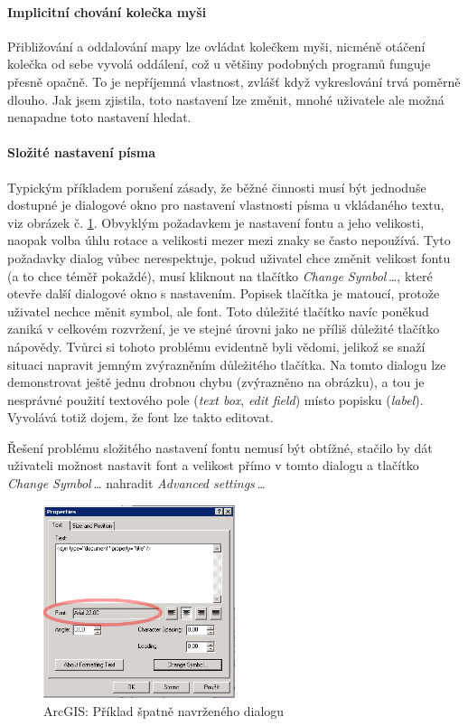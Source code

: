 \documentclass[a4paper,12pt,draft]{article}
\begin{document}
{\paragraph*{Implicitní chování kolečka myši} Přibližování a
oddalování mapy lze ovládat kolečkem myši, nicméně otáčení
kolečka od sebe vyvolá oddálení, což u většiny podobných programů
funguje přesně opačně. To je nepříjemná vlastnost, zvlášť když
vykreslování trvá poměrně dlouho. Jak jsem zjistila, toto nastavení
lze změnit, mnohé uživatele ale možná nenapadne toto nastavení hledat.

\paragraph*{Složité nastavení písma}  Typickým příkladem porušení
zásady, že běžné činnosti musí být jednoduše dostupné je dialogové
okno pro nastavení vlastnosti písma u vkládaného textu, viz obrázek
č. \ref{fig:ArcGIS_text_dialog}. Obvyklým požadavkem je nastavení
fontu a jeho velikosti, naopak volba úhlu rotace a velikosti mezer mezi
znaky se často nepoužívá. Tyto požadavky dialog vůbec nerespektuje,
pokud uživatel chce změnit velikost fontu (a to chce téměř pokaždé),
musí kliknout na tlačítko \emph{Change Symbol\,\ldots}, které otevře
další dialogové okno s nastavením. Popisek tlačítka je matoucí,
protože uživatel nechce měnit symbol, ale font. Toto důležité
tlačítko navíc poněkud zaniká v celkovém rozvržení, je ve stejné
úrovni jako ne příliš důležité tlačítko nápovědy. Tvůrci si
tohoto problému evidentně byli vědomi, jelikož se snaží situaci
napravit jemným zvýrazněním důležitého tlačítka. Na tomto dialogu
lze demonstrovat ještě jednu drobnou chybu (zvýrazněno na obrázku),
a tou je nesprávné použití textového pole (\emph{text box}, \emph{edit field})
místo
popisku (\emph{label}). Vyvolává totiž dojem, že font lze takto editovat.

Řešení problému složitého nastavení fontu nemusí být obtížné,
stačilo by dát uživateli možnost nastavit font a velikost přímo v
tomto dialogu a tlačítko \emph{Change Symbol\,\ldots} nahradit \emph{Advanced
settings\,\ldots}

\begin{figure}[h!]
    \centering
    \includegraphics[width=0.5\textwidth]{./GUI_screenshots/ArcGIS_text_dialog.png}
    \caption{ArcGIS: Příklad špatně navrženého dialogu}
    \label{fig:ArcGIS_text_dialog}
\end{figure}

}
\end{document}
